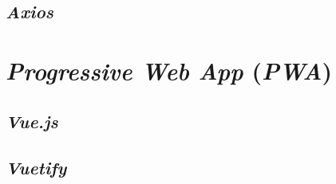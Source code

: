 \lipsum[6]
\vspace{0.5ex}

\subsection{\emph{Axios}}
\vspace{1ex}

\lipsum[7]
\vspace{0.5ex}

\section{\emph{Progressive Web App} (\emph{PWA})}
\vspace{1ex}

\lipsum[8]
\vspace{0.5ex}

\subsection{\emph{Vue.js}}
\vspace{1ex}

\lipsum[9]
\vspace{0.5ex}

\subsection{\emph{Vuetify}}
\vspace{1ex}

\lipsum[10]
\vspace{0.5ex}
